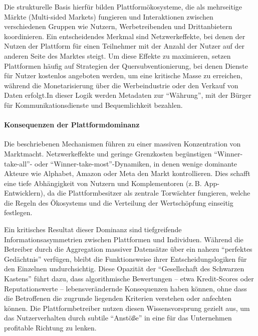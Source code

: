 Die strukturelle Basis hierfür bilden Plattformökosysteme, die als mehrseitige Märkte (Multi-sided Markets) fungieren und Interaktionen zwischen verschiedenen Gruppen wie Nutzern, Werbetreibenden und Drittanbietern koordinieren. Ein entscheidendes Merkmal sind Netzwerkeffekte, bei denen der Nutzen der Plattform für einen Teilnehmer mit der Anzahl der Nutzer auf der anderen Seite des Marktes steigt. Um diese Effekte zu maximieren, setzen Plattformen häufig auf Strategien der Quersubventionierung, bei denen Dienste für Nutzer kostenlos angeboten werden, um eine kritische Masse zu erreichen, während die Monetarisierung über die Werbeindustrie oder den Verkauf von Daten erfolgt.\vglfootcite[32, 35, 48--49] In dieser Logik werden Metadaten zur \enquote{Währung}, mit der Bürger für Kommunikationsdienste und Bequemlichkeit bezahlen.

\paragraph{Konsequenzen der Plattformdominanz}

Die beschriebenen Mechanismen führen zu einer massiven Konzentration von Marktmacht. Netzwerkeffekte und geringe Grenzkosten begünstigen \enquote{Winner-take-all}- oder \enquote{Winner-take-most}-Dynamiken, in denen wenige dominante Akteure wie Alphabet, Amazon oder Meta den Markt kontrollieren. Dies schafft eine tiefe Abhängigkeit von Nutzern und Komplementoren (z.\,B. App-Entwicklern), da die Plattformbesitzer als zentrale Torwächter fungieren, welche die Regeln des Ökosystems und die Verteilung der Wertschöpfung einseitig festlegen.

Ein kritisches Resultat dieser Dominanz sind tiefgreifende Informationsasymmetrien zwischen Plattformen und Individuen. Während die Betreiber durch die Aggregation massiver Datensätze über ein nahezu \enquote{perfektes Gedächtnis} verfügen, bleibt die Funktionsweise ihrer Entscheidungslogiken für den Einzelnen undurchsichtig. Diese Opazität der \enquote{Gesellschaft des Schwarzen Kastens} führt dazu, dass algorithmische Bewertungen -- etwa Kredit-Scores oder Reputationswerte -- lebensverändernde Konsequenzen haben können, ohne dass die Betroffenen die zugrunde liegenden Kriterien verstehen oder anfechten können. Die Plattformbetreiber nutzen diesen Wissensvorsprung gezielt aus, um das Nutzerverhalten durch subtile \enquote{Anstöße} in eine für das Unternehmen profitable Richtung zu lenken.

